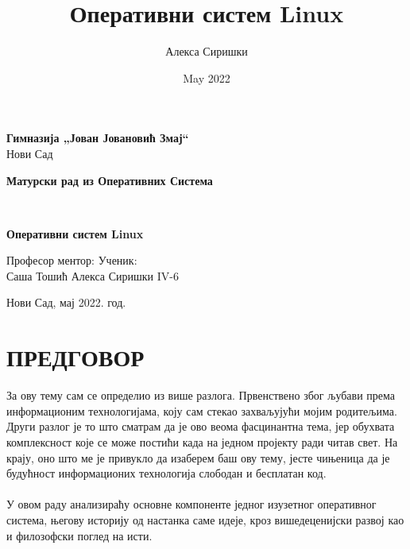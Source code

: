 \documentclass[a4paper,14pt]{article}
\title{Оперативни систем Linux}
\author{Алекса Сиришки}
\date{May 2022}
\begin{document}
\pagestyle{empty}
\begin{center}
\textbf{Гимназија „Јован Јовановић Змај“}
\\
Нови Сад
\end{center}
\vfill
\begin{center}
	\begin{large}
		\textbf{Матурски рад из Оперативних Система}
		\bigskip 
	\end{large}
	\\
	\begin{huge}
        \textbf{Оперативни систем Linux}
	\end{huge}
\end{center}
\vfill
\begin{normalsize}
Професор ментор:
\hfill
Ученик:
\\
Саша Тошић
\hfill
Алекса Сиришки IV-6
\end{normalsize}
\vfill
\begin{center}
Нови Сад, мај 2022. год.
\end{center}
\newpage

\pagestyle{plain}
\section*{ПРЕДГОВОР}
За ову тему сам се определио из више разлога. Првенствено због љубави према информационим технологијама, коју сам стекао захваљујући мојим родитељима. Други разлог је то што сматрам да је ово веома фасцинантна тема, јер обухвата комплексност које се може постићи када на једном пројекту ради читав свет. На крају, оно што ме је привукло да изаберем баш ову тему, јесте чињеница да је будућност информационих технологија слободан и бесплатан код.
\\\\
У овом раду анализираћу основне компоненте једног изузетног оперативног система, његову историју од настанка саме идеје, кроз вишедеценијски развој као и филозофски поглед на исти.
\newpage

\renewcommand{\contentsname}{САДРЖАЈ}
\tableofcontents
\newpage

\pagestyle{fancy}
\fancyhf{}
\cfoot{\thepage}
\end{document}
